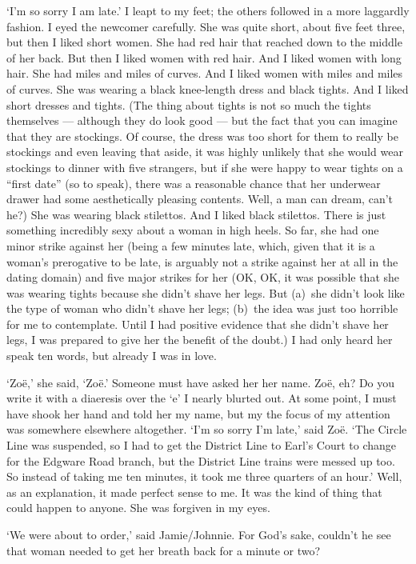 `I'm so sorry I am late.' I leapt to my feet; the others
followed in a more laggardly fashion. I eyed the newcomer carefully. She was quite short, about five
feet three, but then I liked short women. She had red hair that
reached down to the middle of her back. But then I liked women with
red hair. And I liked women with long hair. She had miles and miles
of curves. And I liked women with miles and miles of curves. She was
wearing a black knee-length dress and black tights. And I liked
short dresses and tights. (The thing about tights is not so much the tights
themselves --- although they do look good --- but the fact that you can imagine that they are
stockings. Of course, the dress was too short for them to really be
stockings and even leaving that aside, it was highly unlikely that
she would wear stockings to dinner with five strangers, but if she were happy to wear tights on a ``first
date'' (so to speak), there was a reasonable chance that her
underwear drawer had some aesthetically pleasing contents. Well, a
man can dream, can't he?) She was wearing black stilettos. And I
liked black stilettos. There is just something incredibly sexy about
a woman in high heels. So far, she had one minor strike against her
(being a few minutes late, which, given that it is a woman's
prerogative to be late, is arguably not a strike against her at all in the
dating domain) and five major strikes for her (OK, OK, it was
possible that she was wearing tights because she didn't shave her
legs. But (a)~she didn't look like the type of woman who didn't shave her legs;
(b)~the idea was just too horrible for me to contemplate. Until I
had positive evidence that she didn't shave her legs, I was prepared
to give her the benefit of the doubt.) I had only heard her speak
ten words, but already I was in love.

`Zoë,' she said, `Zoë.' Someone must have asked her her
name. Zoë, eh? Do you write it with a diaeresis over the `e' I
nearly blurted out. At some point, I must have shook her hand and
told her my name, but my the focus of my attention was somewhere elsewhere altogether. `I'm so sorry I'm
late,' said Zoë. `The Circle Line was suspended, so I had to get the District
Line to Earl's Court to change for the Edgware Road branch, but the District Line trains were messed up too. So
instead of taking me ten minutes, it took me three quarters of an
hour.' Well, as an explanation, it made perfect sense to me. It was the kind of thing
that could happen to anyone. She was forgiven in my eyes.

`We were about to order,' said Jamie/Johnnie. For God's sake,
couldn't he see that woman needed to get her breath back for a
minute or two?

